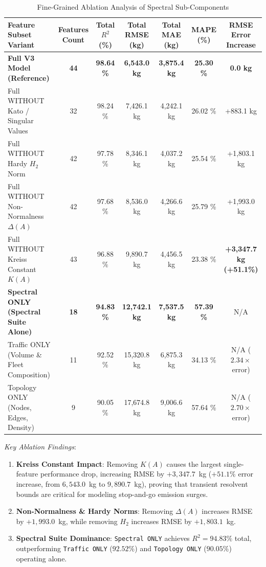 \documentclass[lettersize,journal]{IEEEtran}
\begin{document}
\begin{table}[htbp]
\caption{Fine-Grained Ablation Analysis of Spectral Sub-Components}
\label{tab:fine_ablation}
\centering
\begin{tabular}{lcccccc}
\toprule
Feature Subset Variant & Features Count & Total $R^2$ (\%) & Total RMSE (kg) & Total MAE (kg) & MAPE (\%) & RMSE Error Increase \\
\midrule
\textbf{Full V3 Model (Reference)} & \textbf{44} & \textbf{98.64 \%} & \textbf{6,543.0 kg} & \textbf{3,875.4 kg} & \textbf{25.30 \%} & \textbf{0.0 kg} \\
Full WITHOUT Kato / Singular Values & 32 & 98.24 \% & 7,426.1 kg & 4,242.1 kg & 26.02 \% & +883.1 kg \\
Full WITHOUT Hardy $H_2$ Norm & 42 & 97.78 \% & 8,346.1 kg & 4,037.2 kg & 25.54 \% & +1,803.1 kg \\
Full WITHOUT Non-Normalness $\Delta(A)$ & 42 & 97.68 \% & 8,536.0 kg & 4,266.6 kg & 25.79 \% & +1,993.0 kg \\
Full WITHOUT Kreiss Constant $K(A)$ & 43 & 96.88 \% & 9,890.7 kg & 4,456.5 kg & 23.38 \% & \textbf{+3,347.7 kg (+51.1\%)} \\
\midrule
\textbf{Spectral ONLY (Spectral Suite Alone)} & \textbf{18} & \textbf{94.83 \%} & \textbf{12,742.1 kg} & \textbf{7,537.5 kg} & \textbf{57.39 \%} & N/A \\
Traffic ONLY (Volume \& Fleet Composition) & 11 & 92.52 \% & 15,320.8 kg & 6,875.3 kg & 34.13 \% & N/A ($2.34 \times$ error) \\
Topology ONLY (Nodes, Edges, Density) & 9 & 90.05 \% & 17,674.8 kg & 9,006.6 kg & 57.64 \% & N/A ($2.70 \times$ error) \\
\bottomrule
\end{tabular}
\end{table}

\textit{Key Ablation Findings}:
\begin{enumerate}
    \item \textbf{Kreiss Constant Impact}: Removing $K(A)$ causes the largest single-feature performance drop, increasing RMSE by $+3,347.7$~kg ($+51.1\%$ error increase, from $6,543.0$~kg to $9,890.7$~kg), proving that transient resolvent bounds are critical for modeling stop-and-go emission surges.
    \item \textbf{Non-Normalness \& Hardy Norms}: Removing $\Delta(A)$ increases RMSE by $+1,993.0$~kg, while removing $H_2$ increases RMSE by $+1,803.1$~kg.
    \item \textbf{Spectral Suite Dominance}: \texttt{Spectral ONLY} achieves $R^2 = 94.83\%$ total, outperforming \texttt{Traffic ONLY} ($92.52\%$) and \texttt{Topology ONLY} ($90.05\%$) operating alone.

\end{enumerate}
\end{document}

